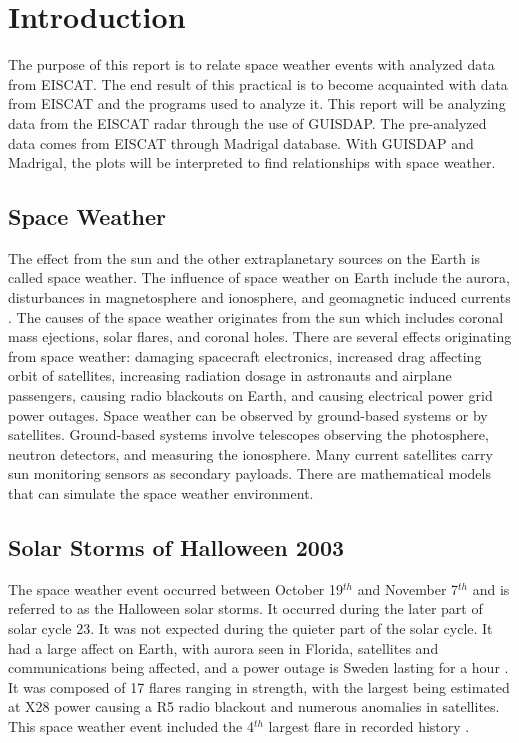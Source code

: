 
\section{Introduction}
The purpose of this report is to relate space weather events with analyzed data from EISCAT.
The end result of this practical is to become acquainted with data from EISCAT and the programs used to analyze it.
This report will be analyzing data from the EISCAT radar through the use of GUISDAP. 
The pre-analyzed data comes from EISCAT through Madrigal database.
With GUISDAP and Madrigal, the plots will be interpreted to find relationships with space weather. 

\subsection{Space Weather}
The effect from the sun and the other extraplanetary sources on the Earth is called space weather. 
The influence of space weather on Earth include the aurora, disturbances in magnetosphere and ionosphere, and geomagnetic induced currents \cite{NOAA_2}. 
The causes of the space weather originates from the sun which includes coronal mass ejections, solar flares, and coronal holes.
There are several effects originating from space weather: damaging spacecraft electronics, increased drag affecting orbit of satellites, increasing radiation dosage in astronauts and airplane passengers, causing radio blackouts on Earth, and causing electrical power grid power outages.
Space weather can be observed by ground-based systems or by satellites. Ground-based systems involve telescopes observing the photosphere, neutron detectors, and measuring the ionosphere.
Many current satellites carry sun monitoring sensors as secondary payloads.
There are mathematical models that can simulate the space weather environment.

\subsection{Solar Storms of Halloween 2003}
The space weather event  occurred between October 19$^{th}$ and November 7$^{th}$ and is referred to as the Halloween solar storms. 
It occurred during the later part of solar cycle 23. It was not expected during the quieter part of the solar cycle.
It had a large affect on Earth, with aurora seen in Florida, satellites and communications being affected, and a power outage is Sweden lasting for a hour \cite{NASA_1}. 
It was composed of 17 flares ranging in strength, with the largest being estimated at X28 power causing a R5 radio blackout and numerous anomalies in satellites. 
This space weather event included the 4$^{th}$ largest flare in recorded history \cite{NOAA}.
